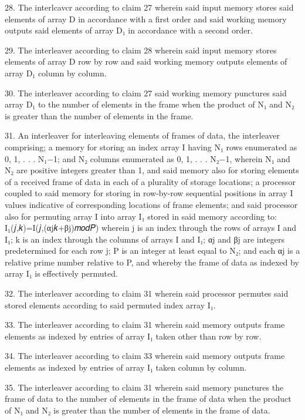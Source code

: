 \documentclass[11pt,a4paper]{article}
\begin{document}
28. The interlcavcr according to claim 27 wherein said input memory stores said elements of array D in accordance with a first order and said working memory outputs said elements of array D₁ in accordance with a second order.

29. The interleaver according to claim 28 wherein said input memory stores elements of array D row by row and said working memory outputs elements of array D₁ column by column.

30. The interleaver according to claim 27 said working memory punctures said array D₁ to the number of elements in the frame when the product of N₁ and N₂ is greater than the number of elements in the frame.

31. An interleaver for interleaving elements of frames of data, the interleaver comprising; a memory for storing an index array I having N₁ rows enumerated as 0, 1, . . . N₁−1; and N₂ columns enumerated as 0, 1, . . . N₂−1, wherein N₁ and N₂ are positive integers greater than 1, and said memory also for storing elements of a received frame of data in each of a plurality of storage locations; a processor coupled to said memory for storing in row-by-row sequential positions in array I values indicative of corresponding locations of frame elements; and said processor also for permuting array I into array I₁ stored in said memory according to: I₁(𝑗,𝑘)=I(𝑗,(αj𝑘+βj)𝑚𝑜𝑑𝑃)  wherein j is an index through the rows of arrays I and I₁; k is an index through the columns of arrays I and I₁; αj and βj are integers predetermined for each row j; P is an integer at least equal to N₂; and each αj is a relative prime number relative to P, and whereby the frame of data as indexed by array I₁ is effectively permuted.

32. The interleaver according to claim 31 wherein said processor permutes said stored elements according to said permuted index array I₁.

33. The interleaver according to claim 31 wherein said memory outputs frame elements as indexed by entries of array I₁ taken other than row by row.

34. The interleaver according to claim 33 wherein said memory outputs frame elements as indexed by entries of array I₁ taken column by column.

35. The interleaver according to claim 31 wherein said memory punctures the frame of data to the number of elements in the frame of data when the product of N₁ and N₂ is greater than the number of elements in the frame of data.
\end{document}
